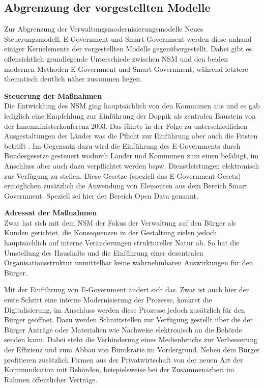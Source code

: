 \subsection{Abgrenzung der vorgestellten Modelle}
Zur Abgrenzung der Verwaltungsmodernisierungsmodelle Neues Steuerungsmodell, E-Government und Smart Government werden diese anhand einiger Kernelemente der vorgestellten Modelle gegenübergestellt.
Dabei gibt es offensichtlich grundlegende Unterschiede zwischen NSM und den beiden \glqq{}modernen\grqq{} Methoden E-Government und Smart Government, während letztere thematisch deutlich näher zusammen liegen.

\textbf{Steuerung der Maßnahmen}\\
Die Entwicklung des NSM ging hauptsächlich von den Kommunen aus und es gab lediglich eine Empfehlung zur Einführung der Doppik als zentralen Baustein von der Innenministerkonferenz 2003.
Das führte in der Folge zu unterschiedlichen Ausgestaltungen der Länder was die Pflicht zur Einführung aber auch die Fristen betrifft \citep[][]{Mehde2019}.
Im Gegensatz dazu wird die Einführung des E-Governments durch Bundesgesetze gesteuert wodurch Länder und Kommunen zum einen befähigt, im Anschluss aber auch dazu verpflichtet werden bspw. Dienstleistungen elektronisch zur Verfügung zu stellen.
Diese Gesetze (speziell das E-Government-Gesetz) ermöglichen zusätzlich die Anwendung von Elementen aus dem Bereich Smart Government.
Speziell sei hier der Bereich Open Data genannt.

\textbf{Adressat der Maßnahmen}\\
Zwar hat sich mit dem NSM der Fokus der Verwaltung auf den Bürger als Kunden gerichtet, die Konsequenzen in der Gestaltung zielen jedoch hauptsächlich auf interne Veränderungen struktureller Natur ab.
So hat die Umstellung des Haushalts und die Einführung einer dezentralen Organisationsstruktur unmittelbar keine wahrnehmbaren Auswirkungen für den Bürger.

Mit der Einführung von E-Government ändert sich das.
Zwar ist auch hier der erste Schritt eine interne Modernisierung der Prozesse, konkret die Digitalisierung, im Anschluss werden diese Prozesse jedoch zusätzlich für den Bürger geöffnet.
Dazu werden Schnittstellen zur Verfügung gestellt über die der Bürger Anträge oder Materialien wie Nachweise elektronisch an die Behörde senden kann.
Dabei steht die Verhinderung eines Medienbruchs zur Verbesserung der Effizienz und zum Abbau von Bürokratie im Vordergrund.
Neben dem Bürger profitieren zusätzlich Firmen aus der Privatwirtschaft von der neuen Art der Kommunikation mit Behörden, beispielsweise bei der Zusammenarbeit im Rahmen öffentlicher Verträge.


